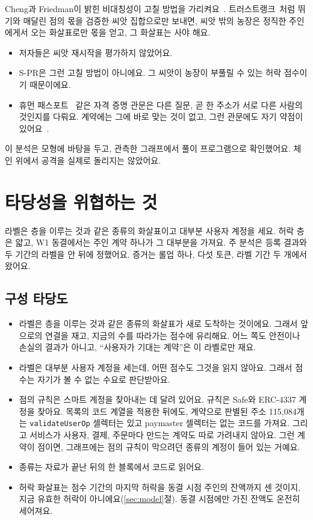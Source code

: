 Cheng과 Friedman이 밝힌 비대칭성이 고칠 방법을 가리켜요~\cite{cheng2005sybilproof}. 트러스트랭크~\cite{gyongyi2004trustrank}처럼 뛰기와 매달린 점의 몫을 검증한 씨앗 집합으로만 보내면, 씨앗 밖의 농장은 정직한 주인에게서 오는 화살표로만 몫을 얻고, 그 화살표는 사야 해요.
\begin{itemize}
\item 저자들은 씨앗 재시작을 평가하지 않았어요.
\item S-PR은 그런 고칠 방법이 아니에요. 그 씨앗이 농장이 부풀릴 수 있는 허락 점수이기 때문이에요.
\item 휴먼 패스포트~\cite{humanpassportnddocs} 같은 자격 증명 관문은 다른 질문, 곧 한 주소가 서로 다른 사람의 것인지를 다뤄요. 계약에는 그에 바로 맞는 것이 없고, 그런 관문에도 자기 약점이 있어요~\cite{bordeianu2026sybil}.
\end{itemize}
이 분석은 모형에 바탕을 두고, 관측한 그래프에서 풀이 프로그램으로 확인했어요. 체인 위에서 공격을 실제로 돌리지는 않았어요.

\section{타당성을 위협하는 것}
\label{sec:threats}

\begin{yoji}
라벨은 층을 이루는 것과 같은 종류의 화살표이고 대부분 사용자 계정을 세요. 허락 층은 얇고, W1 동결에서는 주인 계약 하나가 그 대부분을 가져요. 주 분석은 등록 결과와 두 기간의 라벨을 안 뒤에 정했어요. 증거는 롤업 하나, 다섯 토큰, 라벨 기간 두 개에서 왔어요.
\end{yoji}

\subsection{구성 타당도}

\begin{itemize}
\item 라벨은 층을 이루는 것과 같은 종류의 화살표가 새로 도착하는 것이에요. 그래서 앞으로의 연결을 재고, 지금의 수를 따라가는 점수에 유리해요. 어느 쪽도 안전이나 손실의 결과가 아니고, “사용자가 기대는 계약”은 이 라벨로만 재요.
\item 라벨은 대부분 사용자 계정을 세는데, 어떤 점수도 그것을 읽지 않아요. 그래서 점수는 자기가 볼 수 없는 수요로 판단받아요.
\item 점의 규칙은 스마트 계정을 찾아내는 데 달려 있어요. 규칙은 Safe와 ERC-4337 계정을 찾아요. 목록의 코드 계열을 적용한 뒤에도, 계약으로 판별된 주소 115,084개는 \texttt{validateUserOp} 셀렉터는 있고 paymaster 셀렉터는 없는 코드를 가져요. 그리고 서비스가 사용자, 결제, 주문마다 만드는 계약도 따로 가려내지 않아요. 그런 계약이 점이면, 그래프에는 점의 규칙이 막으려던 종류의 계정이 들어 있는 거예요.
\item 종류는 자료가 끝난 뒤의 한 블록에서 코드로 읽어요.
\item 허락 화살표는 점수 기간의 마지막 허락을 동결 시점 주인의 잔액까지 센 것이지, 지금 유효한 허락이 아니에요(\ref{sec:model}절). 동결 시점에만 가진 잔액도 온전히 세어져요.
\end{itemize}

